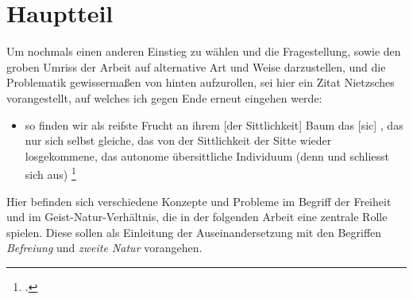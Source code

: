 \documentclass[12pt, a4paper, openany]{report}
\begin{document}
\chapter{Hauptteil}
Um nochmals einen anderen Einstieg zu wählen und die Fragestellung, sowie den groben Umriss der Arbeit auf alternative Art und Weise darzustellen, und die Problematik gewissermaßen von hinten aufzurollen, sei hier ein Zitat Nietzsches vorangestellt, auf welches ich gegen Ende erneut eingehen werde:
\begin{itemize}
    \item[] \textelp{} so finden wir als reifste Frucht an ihrem [der Sittlichkeit] Baum das  [sic] , das nur sich selbst gleiche, das von der Sittlichkeit der Sitte wieder losgekommene, das autonome übersittliche Individuum (denn  und  schliesst sich aus) \textelp{} \footcite[][293]{nietzsche_jenseits_2014}
\end{itemize} 
Hier befinden sich verschiedene Konzepte und Probleme im Begriff der Freiheit und im Geist-Natur-Verhältnis, die in der folgenden Arbeit eine zentrale Rolle spielen. 
Diese sollen als Einleitung der Auseinandersetzung mit den Begriffen \emph{Befreiung} und \emph{zweite Natur} vorangehen.\\
\end{document}
